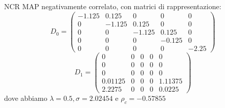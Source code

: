 \documentclass{beamer}
\begin{document}
\begin{frame}
    \frametitle{}
    \begin{block}{NCR}
        MAP negativamente correlato, con matrici di rappresentazione:
        \begin{equation*}
            D_0 =
            \begin{pmatrix}
                -1.125 & 0.125 & 0 & 0 & 0 \\
                0 & -1.125 & 0.125 & 0 & 0 \\
                0 & 0 & -1.125 & 0.125 & 0 \\
                0 & 0 & 0 & -0.125 & 0 \\
                0 & 0 & 0 & 0 & -2.25
            \end{pmatrix}
        \end{equation*}
        \begin{equation*}
            D_1 =
            \begin{pmatrix}
                0 & 0 & 0 & 0 & 0 \\
                0 & 0 & 0 & 0 & 0 \\
                0 & 0 & 0 & 0 & 0 \\
                0.01125 & 0 & 0 & 0 & 1.11375 \\
                2.2275 & 0 & 0 & 0 & 0.0225
            \end{pmatrix}
        \end{equation*}
        dove abbiamo $\lambda = 0.5, \sigma = 2.02454$ e $\rho_c =  -0.57855$
    \end{block}
\end{frame}
\end{document}
